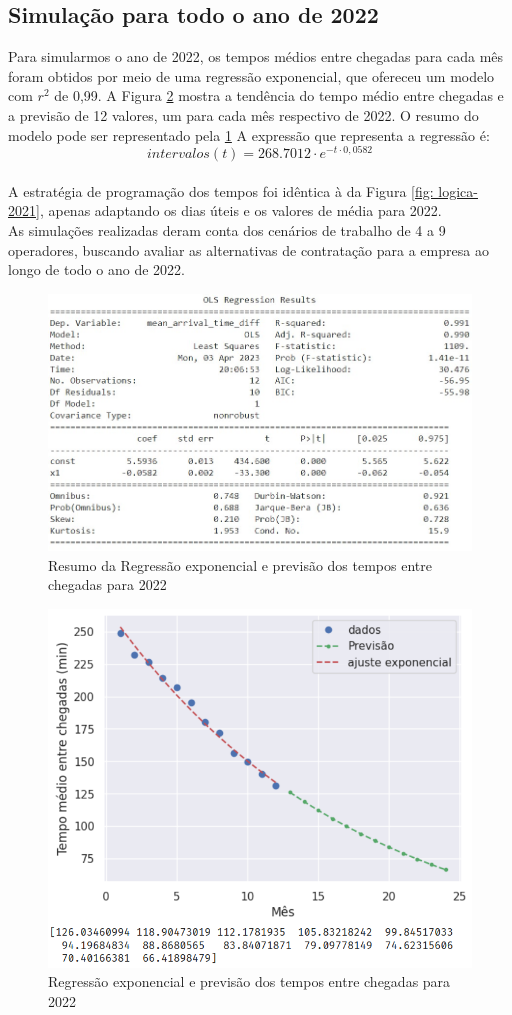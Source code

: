 \subsection{Simulação para todo o ano de 2022}
\label{section: sim-2022}
Para simularmos o ano de 2022, os tempos médios entre chegadas para cada mês foram obtidos por meio de uma regressão exponencial, que ofereceu um modelo com $r^2$ de 0,99. A Figura \ref*{fig: regressao-expo-2022} mostra a tendência do tempo médio entre chegadas e a previsão de 12 valores, um para cada mês respectivo de 2022. O resumo do modelo pode ser representado pela \ref*{fig: resumo-expo-2022} A expressão que representa a regressão é: $$intervalos(t) = 268.7012 \cdot e^{-t \cdot 0,0582}$$\\
A estratégia de programação dos tempos foi idêntica à da Figura \ref*{fig: logica-2021}, apenas adaptando os dias úteis e os valores de média para 2022.\\
As simulações realizadas deram conta dos cenários de trabalho de 4 a 9 operadores, buscando avaliar as alternativas de contratação para a empresa ao longo de todo o ano de 2022.

\begin{figure}[H]
    \centering
    \includegraphics[scale=0.9]{simulacao/resumo_OLS_previsao2022.jpg}
    \caption{Resumo da Regressão exponencial e previsão dos tempos entre chegadas para 2022}
    \label{fig: resumo-expo-2022}
\end{figure}


\begin{figure}[H]
    \centering
    \includegraphics[scale=1]{simulacao/regressao-expo-2022.png}
    \caption{Regressão exponencial e previsão dos tempos entre chegadas para 2022}
    \label{fig: regressao-expo-2022}
\end{figure}

